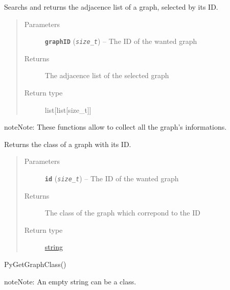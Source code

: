 \documentclass[letterpaper,10pt,english]{sphinxmanual}
\begin{document}
\begin{fulllineitems}
\label{doc:PythonGedLib.PyGetGraphAdjacenceMatrix}
Searchs and returns the adjacence list of a graph, selected by its ID.
\begin{quote}\begin{description}
\item[{Parameters}] \leavevmode
\textbf{\texttt{graphID}} (\emph{\texttt{size\_t}}) -- The ID of the wanted graph

\item[{Returns}] \leavevmode
The adjacence list of the selected graph

\item[{Return type}] \leavevmode
list{[}list{[}size\_t{]}{]}

\end{description}\end{quote}

\begin{notice}{note}{Note:}
These functions allow to collect all the graph's informations.
\end{notice}

\end{fulllineitems}


\begin{fulllineitems}
\label{doc:PythonGedLib.PyGetGraphClass}
Returns the class of a graph with its ID.
\begin{quote}\begin{description}
\item[{Parameters}] \leavevmode
\textbf{\texttt{id}} (\emph{\texttt{size\_t}}) -- The ID of the wanted graph

\item[{Returns}] \leavevmode
The class of the graph which correpond to the ID

\item[{Return type}] \leavevmode
\href{https://docs.python.org/3/library/string.html\#module-string}{string}

\end{description}\end{quote}




PyGetGraphClass()



\begin{notice}{note}{Note:}
An empty string can be a class.
\end{notice}

\end{fulllineitems}
\end{document}
